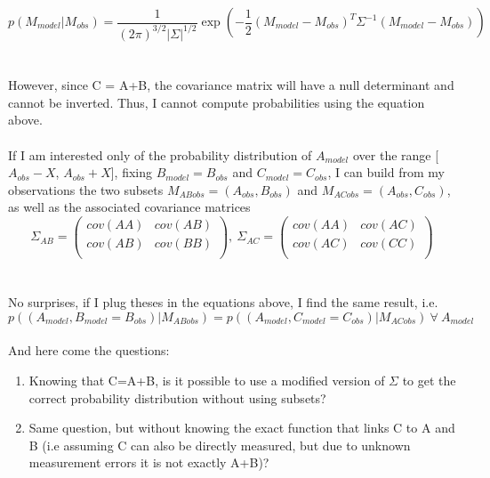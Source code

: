 \documentclass[11pt]{scrartcl}
\begin{document}
\begin{equation*}
p(M_{model} |M_{obs}) = \frac{1}{(2 \pi)^{3/2} 
|\Sigma|^{1/2}}\exp\left( -\frac{1}{2} 
(M_{model}-M_{obs})^T\Sigma^{-1}(M_{model}-M_{obs}) \right)
\end{equation*}
\\
\\
However, since C = A+B, the covariance matrix will have a null 
determinant and cannot be inverted. Thus, I cannot compute probabilities 
using the equation above.\\ 
\\
If I am interested only of the probability distribution of $A_{model}$ 
over the range [$A_{obs}-X$, $A_{obs}+X$], fixing $B_{model} = B_{obs}$ 
and $C_{model} = C_{obs}$, I can build from my observations the two 
subsets $M_{ABobs}=(A_{obs}, B_{obs})$ and $M_{ACobs} = (A_{obs}, 
C_{obs})$, as well as the associated covariance matrices
\begin{equation*}
\Sigma_{AB}=
  \begin{pmatrix}
    cov(AA) & cov(AB) \\
    cov(AB) & cov(BB) \\     
  \end{pmatrix}
,\ \Sigma_{AC}=
  \begin{pmatrix}
    cov(AA) & cov(AC) \\
    cov(AC) & cov(CC) \\   
  \end{pmatrix}  
\end{equation*}
\\
\\
No surprises, if I plug theses in the equations above, I find the 
same result, i.e.\\ $p((A_{model}, B_{model}=B_{obs})|M_{ABobs}) = 
p((A_{model}, C_{model}=C_{obs})|M_{ACobs})  \ \forall \ A_{model} $ \\
\\
And here come the questions:
\begin{enumerate}
 \item Knowing that C=A+B, is it possible to use a modified version of 
$\Sigma$ to get the correct probability distribution without using 
subsets?
 \item Same question, but without knowing the exact function that links 
C to A and B (i.e assuming C can also be directly measured, but due to 
unknown measurement errors it is not exactly A+B)?
 
\end{enumerate}
\end{document}
